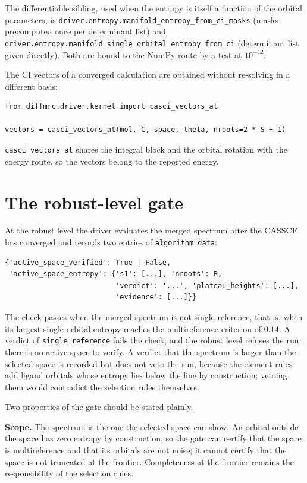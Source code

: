The differentiable sibling, used when the entropy is itself a function
of the orbital parameters, is
\texttt{driver.entropy.manifold\_entropy\_from\_ci\_masks} (masks
precomputed once per determinant list) and
\texttt{driver.entropy.manifold\_single\_orbital\_entropy\_from\_ci}
(determinant list given directly).  Both are bound to the NumPy route
by a test at $10^{-12}$.

The CI vectors of a converged calculation are obtained without
re-solving in a different basis:
\begin{lstlisting}
from diffmrc.driver.kernel import casci_vectors_at

vectors = casci_vectors_at(mol, C, space, theta, nroots=2 * S + 1)
\end{lstlisting}
\texttt{casci\_vectors\_at} shares the integral block and the orbital
rotation with the energy route, so the vectors belong to the reported
energy.

\section{The robust-level gate}
\label{sec:manifold-gate}

At the robust level the driver evaluates the merged spectrum after the
CASSCF has converged and records two entries of
\texttt{algorithm\_data}:
\begin{lstlisting}
{'active_space_verified': True | False,
 'active_space_entropy': {'s1': [...], 'nroots': R,
                          'verdict': '...', 'plateau_heights': [...],
                          'evidence': [...]}}
\end{lstlisting}
The check passes when the merged spectrum is not single-reference,
that is, when its largest single-orbital entropy reaches the
multireference criterion of $0.14$.  A verdict of
\texttt{single\_reference} fails the check, and the robust level
refuses the run: there is no active space to verify.  A verdict that
the spectrum is larger than the selected space is recorded but does
not veto the run, because the element rules add ligand orbitals whose
entropy lies below the line by construction; vetoing them would
contradict the selection rules themselves.

Two properties of the gate should be stated plainly.

\textbf{Scope.}  The spectrum is the one the selected space can show.
An orbital outside the space has zero entropy by construction, so the
gate can certify that the space is multireference and that its
orbitals are not noise; it cannot certify that the space is not
truncated at the frontier.  Completeness at the frontier remains the
responsibility of the selection rules.

